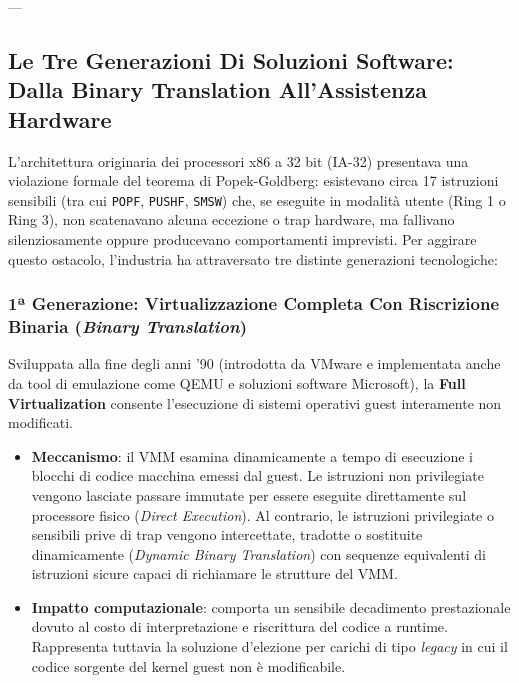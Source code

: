 \documentclass[11pt, a4paper]{article}
\begin{document}
---

\subsection{Le Tre Generazioni Di Soluzioni Software: Dalla Binary Translation All'Assistenza Hardware}

L'architettura originaria dei processori x86 a 32 bit (IA-32) presentava una violazione formale del teorema di Popek-Goldberg: esistevano circa 17 istruzioni sensibili (tra cui \texttt{POPF}, \texttt{PUSHF}, \texttt{SMSW}) che, se eseguite in modalità utente (Ring 1 o Ring 3), non scatenavano alcuna eccezione o trap hardware, ma fallivano silenziosamente oppure producevano comportamenti imprevisti. Per aggirare questo ostacolo, l'industria ha attraversato tre distinte generazioni tecnologiche:


\subsubsection{1ª Generazione: Virtualizzazione Completa Con Riscrizione Binaria (\emph{Binary Translation})}
Sviluppata alla fine degli anni '90 (introdotta da VMware e implementata anche da tool di emulazione come QEMU e soluzioni software Microsoft), la \textbf{Full Virtualization} consente l'esecuzione di sistemi operativi guest interamente non modificati.
\begin{itemize}
    \item \textbf{Meccanismo}: il VMM esamina dinamicamente a tempo di esecuzione i blocchi di codice macchina emessi dal guest. Le istruzioni non privilegiate vengono lasciate passare immutate per essere eseguite direttamente sul processore fisico (\emph{Direct Execution}). Al contrario, le istruzioni privilegiate o sensibili prive di trap vengono intercettate, tradotte o sostituite dinamicamente (\emph{Dynamic Binary Translation}) con sequenze equivalenti di istruzioni sicure capaci di richiamare le strutture del VMM.
    \item \textbf{Impatto computazionale}: comporta un sensibile decadimento prestazionale dovuto al costo di interpretazione e riscrittura del codice a runtime. Rappresenta tuttavia la soluzione d'elezione per carichi di tipo \emph{legacy} in cui il codice sorgente del kernel guest non è modificabile.
\end{itemize}
\end{document}
